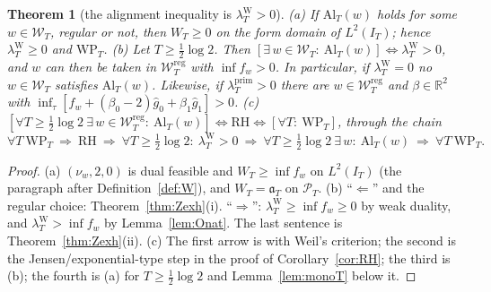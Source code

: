 \documentclass[11pt]{amsart}
\newtheorem{theorem}{Theorem}[section]
\theoremstyle{definition}
\theoremstyle{remark}
\newcommand{\R}{\mathbb R}
\newcommand{\PT}{\mathcal P_T}
\newcommand{\IT}{I_T}
\newcommand{\lamP}{\lambda^{\mathrm{prim}}_T}
\newcommand{\lamW}{\lambda^{\mathrm W}_T}
\newcommand{\gh}[1]{\widehat g_{#1}}
\newcommand{\Wcl}{\mathcal W_T}
\begin{document}
\begin{theorem}[the alignment inequality is $\lamW>0$]\label{thm:Al}
\emph{(a)} If $\mathrm{Al}_T(w)$ holds for some $w\in\Wcl$, regular or not, then $W_T\ge0$ on the form domain of
$L^2(\IT)$; hence $\lamW\ge0$ and $\mathrm{WP}_T$.
\emph{(b)} Let $T\ge\frac12\log2$. Then $[\exists\,w\in\Wcl:\ \mathrm{Al}_T(w)]\iff\lamW>0$, and $w$ can then be
taken in $\Wcl^{\mathrm{reg}}$ with $\inf f_w>0$. In particular, if $\lamW=0$ no $w\in\Wcl$ satisfies
$\mathrm{Al}_T(w)$. Likewise, if $\lamP>0$ there are $w\in\Wcl^{\mathrm{reg}}$ and $\beta\in\R^2$ with
$\inf_\tau[f_w+(\beta_0-2)\gh0+\beta_1\gh1]>0$.
\emph{(c)} $[\forall T\ge\frac12\log2\ \exists\,w\in\Wcl^{\mathrm{reg}}:\ \mathrm{Al}_T(w)]\iff\mathrm{RH}\iff[\forall T:\ \mathrm{WP}_T]$,
through the chain
\[
\forall T\ \mathrm{WP}_T\ \Longrightarrow\ \mathrm{RH}\ \Longrightarrow\ \forall T\ge\tfrac12\log2:\ \lamW>0
\ \Longrightarrow\ \forall T\ge\tfrac12\log2\ \exists\,w:\ \mathrm{Al}_T(w)\ \Longrightarrow\ \forall T\ \mathrm{WP}_T .
\]
\end{theorem}
\begin{proof}
(a) $(\nu_w,2,0)$ is dual feasible and $W_T\ge\inf f_w$ on $L^2(\IT)$ (the paragraph after
Definition~\ref{def:W}), and $W_T=\mathfrak a_T$ on $\PT$. (b) ``$\Leftarrow$'' and the regular choice:
Theorem~\ref{thm:Zexh}(i). ``$\Rightarrow$'': $\lamW\ge\inf f_w\ge0$ by weak duality, and $\lamW>\inf f_w$ by
Lemma~\ref{lem:Onat}. The last sentence is Theorem~\ref{thm:Zexh}(ii). (c) The first arrow is
\cite[Thm.~11.3]{Paper45} with Weil's criterion; the second is the Jensen/exponential-type step in the proof
of Corollary~\ref{cor:RH}; the third is (b); the fourth is (a) for $T\ge\frac12\log2$ and
Lemma~\ref{lem:monoT} below it.
\end{proof}
\end{document}
